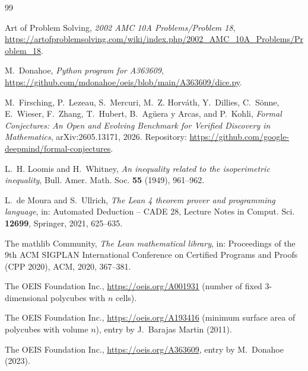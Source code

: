 \documentclass[11pt]{amsart}
\theoremstyle{plain}
\theoremstyle{definition}
\begin{document}
\begin{thebibliography}{99}

Art of Problem Solving, \emph{2002 AMC 10A Problems/Problem 18}, \url{https://artofproblemsolving.com/wiki/index.php/2002_AMC_10A_Problems/Problem_18}.

M.~Donahoe, \emph{Python program for A363609}, \url{https://github.com/mdonahoe/oeis/blob/main/A363609/dice.py}.

M.~Firsching, P.~Lezeau, S.~Mercuri, M.~Z. Horv\'ath, Y.~Dillies, C.~S\"onne, E.~Wieser, F.~Zhang, T.~Hubert, B.~Ag\"uera y Arcas, and P.~Kohli, \emph{Formal Conjectures: An Open and Evolving Benchmark for Verified Discovery in Mathematics}, arXiv:2605.13171, 2026. Repository: \url{https://github.com/google-deepmind/formal-conjectures}.

L.~H. Loomis and H.~Whitney, \emph{An inequality related to the isoperimetric inequality}, Bull. Amer. Math. Soc. \textbf{55} (1949), 961--962.

L.~de Moura and S.~Ullrich, \emph{The Lean 4 theorem prover and programming language}, in: Automated Deduction -- CADE 28, Lecture Notes in Comput. Sci. \textbf{12699}, Springer, 2021, 625--635.

The mathlib Community, \emph{The Lean mathematical library}, in: Proceedings of the 9th ACM SIGPLAN International Conference on Certified Programs and Proofs (CPP 2020), ACM, 2020, 367--381.

The OEIS Foundation Inc., \url{https://oeis.org/A001931} (number of fixed 3-dimensional polycubes with $n$ cells).

The OEIS Foundation Inc., \url{https://oeis.org/A193416} (minimum surface area of polycubes with volume $n$), entry by J.~Barajas Martin (2011).

The OEIS Foundation Inc., \url{https://oeis.org/A363609}, entry by M.~Donahoe (2023).

\end{thebibliography}
\end{document}

